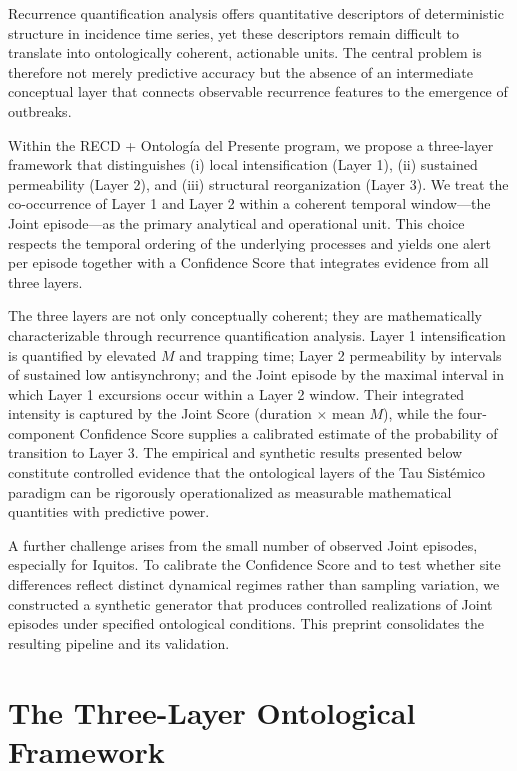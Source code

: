 \documentclass[11pt,a4paper]{article}
\begin{document}
Recurrence quantification analysis offers quantitative descriptors of deterministic structure in incidence time series, yet these descriptors remain difficult to translate into ontologically coherent, actionable units. The central problem is therefore not merely predictive accuracy but the absence of an intermediate conceptual layer that connects observable recurrence features to the emergence of outbreaks.

Within the RECD + Ontología del Presente program, we propose a three-layer framework that distinguishes (i) local intensification (Layer 1), (ii) sustained permeability (Layer 2), and (iii) structural reorganization (Layer 3). We treat the co-occurrence of Layer 1 and Layer 2 within a coherent temporal window—the Joint episode—as the primary analytical and operational unit. This choice respects the temporal ordering of the underlying processes and yields one alert per episode together with a Confidence Score that integrates evidence from all three layers.

The three layers are not only conceptually coherent; they are mathematically characterizable through recurrence quantification analysis. Layer 1 intensification is quantified by elevated $M$ and trapping time; Layer 2 permeability by intervals of sustained low antisynchrony; and the Joint episode by the maximal interval in which Layer 1 excursions occur within a Layer 2 window. Their integrated intensity is captured by the Joint Score (duration $\times$ mean $M$), while the four-component Confidence Score supplies a calibrated estimate of the probability of transition to Layer 3. The empirical and synthetic results presented below constitute controlled evidence that the ontological layers of the Tau Sistémico paradigm can be rigorously operationalized as measurable mathematical quantities with predictive power.

A further challenge arises from the small number of observed Joint episodes, especially for Iquitos. To calibrate the Confidence Score and to test whether site differences reflect distinct dynamical regimes rather than sampling variation, we constructed a synthetic generator that produces controlled realizations of Joint episodes under specified ontological conditions. This preprint consolidates the resulting pipeline and its validation.

\section{The Three-Layer Ontological Framework}
\end{document}
